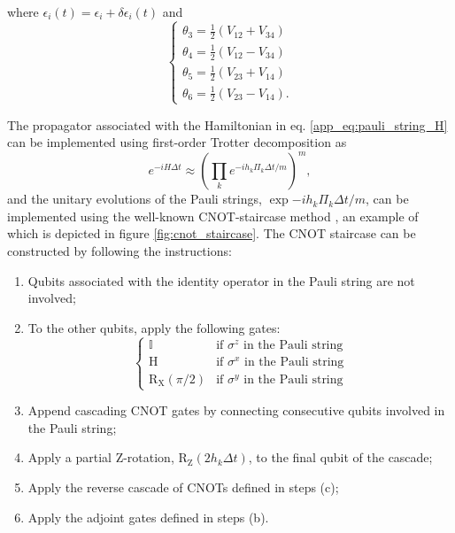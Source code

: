\documentclass[12pt, amsmath, amssymb, graphicx]{iopart}
\begin{document}
%
where $\epsilon_i(t) = \epsilon_i + \delta\epsilon_i(t)$ and
\begin{equation}
    \begin{cases}
        \theta_{3} = \frac{1}{2} \left( V_{12} + V_{34} \right)\\
        \theta_{4} = \frac{1}{2} \left( V_{12} - V_{34} \right)\\
        \theta_{5} = \frac{1}{2} \left( V_{23} + V_{14} \right)\\
        \theta_{6} = \frac{1}{2} \left( V_{23} - V_{14} \right).
    \end{cases}
\end{equation}

The propagator associated with the Hamiltonian in eq. \ref{app_eq:pauli_string_H} can be implemented using first-order Trotter decomposition as
%
\begin{equation}
    e^{-i H \Delta t} \approx \left( \prod_k e^{-i h_k \Pi_k \Delta t / m} \right)^m,
\end{equation}
%
and the unitary evolutions of the Pauli strings, $\exp{-i h_k \Pi_k \Delta t / m}$, can be implemented using the well-known CNOT-staircase method \cite{Jaderberg2022,Sawaya2020,Yordanov2020}, an example of which is depicted in figure \ref{fig:cnot_staircase}.
The CNOT staircase can be constructed by following the instructions:
%
\begin{enumerate}[label=(\alph*)]
    \item Qubits associated with the identity operator in the Pauli string are not involved;
    \item To the other qubits, apply the following gates:
    \begin{equation}
    \begin{cases}
        \mathbb{I} & \text{if }\sigma^z\text{ in the Pauli string}\\
        \text{H} & \text{if }\sigma^x\text{ in the Pauli string}\\
        \text{R}_\text{X}(\pi/2) & \text{if }\sigma^y\text{ in the Pauli string}
    \end{cases}
    \end{equation}
    \item Append cascading CNOT gates by connecting consecutive qubits involved in the Pauli string;
    \item Apply a partial Z-rotation, $\text{R}_\text{Z}(2 h_k \Delta t)$, to the final qubit of the cascade;
    \item Apply the reverse cascade of CNOTs defined in steps (c);
    \item Apply the adjoint gates defined in steps (b).
\end{enumerate}
\end{document}

